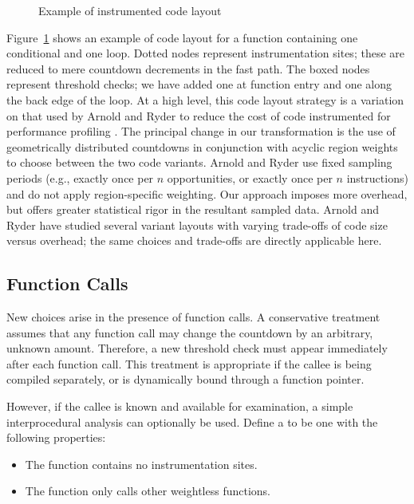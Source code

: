 \begin{figure}
  \centering
  
  \caption{Example of instrumented code layout}
  \label{fig:code-layout}
\end{figure}

Figure~\ref{fig:code-layout} shows an example of code layout for a
function containing one conditional and one loop.  Dotted nodes
represent instrumentation sites; these are reduced to mere countdown
decrements in the fast path.  The boxed nodes represent threshold
checks; we have added one at function entry and one along the back
edge of the loop.  At a high level, this code layout strategy is a
variation on that used by Arnold and Ryder to reduce the cost of code
instrumented for performance profiling \cite{Arnold:2001:FRC}.  The
principal change in our transformation is the use of geometrically
distributed countdowns in conjunction with acyclic region weights to
choose between the two code variants.  Arnold and Ryder use fixed
sampling periods (e.g., exactly once per $n$ opportunities, or exactly
once per $n$ instructions) and do not apply region-specific weighting.
Our approach imposes more overhead, but offers greater statistical
rigor in the resultant sampled data.  Arnold and Ryder have studied
several variant layouts with varying trade-offs of code size versus
overhead; the same choices and trade-offs are directly applicable
here.


\subsection{Function Calls}

New choices arise in the presence of function calls.  A conservative
treatment assumes that any function call may change the countdown by
an arbitrary, unknown amount.  Therefore, a new threshold check must
appear immediately after each function call.  This treatment is
appropriate if the callee is being compiled separately, or is
dynamically bound through a function pointer.

However, if the callee is known and available for examination, a
simple interprocedural analysis can optionally be used.  Define a
 to be one with the following properties:

\begin{itemize}
\item The function contains no instrumentation sites.
\item The function only calls other weightless functions.
\end{itemize}

